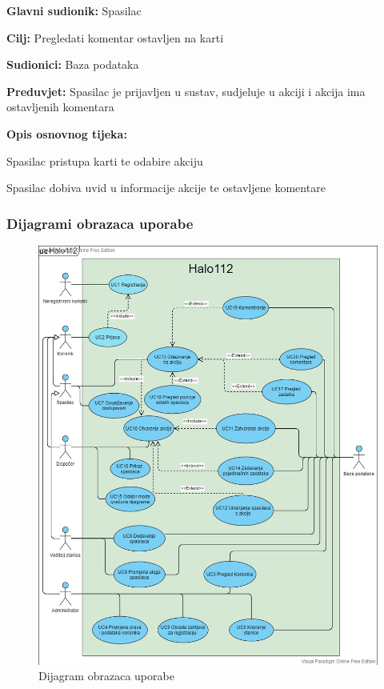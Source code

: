					\noindent {}
					\begin{packed_item}
						
						\item \textbf{Glavni sudionik: } Spasilac
						\item  \textbf{Cilj:} Pregledati komentar ostavljen na karti
						\item  \textbf{Sudionici:} Baza podataka
						\item  \textbf{Preduvjet:} Spasilac je prijavljen u sustav, sudjeluje u akciji i akcija ima ostavljenih komentara
						\item  \textbf{Opis osnovnog tijeka:}
						
						\item[] \begin{packed_enum}
							
							\item  Spasilac pristupa karti te odabire akciju
							\item  Spasilac dobiva uvid u informacije akcije te ostavljene komentare
						\end{packed_enum}
						
					\end{packed_item}	

				\subsubsection{Dijagrami obrazaca uporabe}
					
			
				\begin{figure}[H]
					\includegraphics[scale=0.5]{slike/usecase.PNG}
					\centering
					\caption{Dijagram obrazaca uporabe}
					\label{fig:obrasci_uporabe}
				\end{figure}
				\eject		
				
